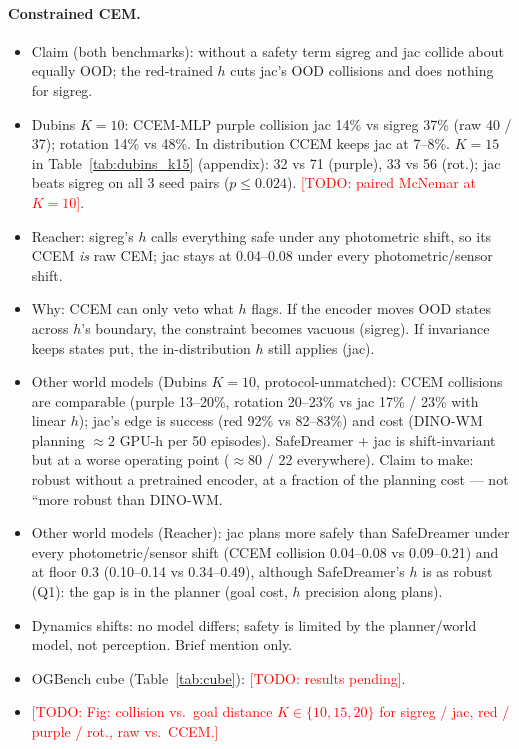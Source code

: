 \documentclass{article}
\newcommand{\todo}[1]{\textcolor{red}{[TODO: #1]}}
\begin{document}
\paragraph{Constrained CEM.}
\begin{itemize}
  \item Claim (both benchmarks): without a safety term sigreg and jac collide about equally OOD; the red-trained $h$ cuts jac's OOD collisions and does nothing for sigreg.
  \item Dubins $K=10$: CCEM-MLP purple collision jac 14\% vs sigreg 37\% (raw 40 / 37); rotation 14\% vs 48\%. In distribution CCEM keeps jac at 7--8\%. $K=15$ in Table~\ref{tab:dubins_k15} (appendix): 32 vs 71 (purple), 33 vs 56 (rot.); jac beats sigreg on all 3 seed pairs ($p\le 0.024$). \todo{paired McNemar at $K=10$}.
  \item Reacher: sigreg's $h$ calls everything safe under any photometric shift, so its CCEM \emph{is} raw CEM; jac stays at 0.04--0.08 under every photometric/sensor shift.
  \item Why: CCEM can only veto what $h$ flags. If the encoder moves OOD states across $h$'s boundary, the constraint becomes vacuous (sigreg). If invariance keeps states put, the in-distribution $h$ still applies (jac).
  \item Other world models (Dubins $K=10$, protocol-unmatched): CCEM collisions are comparable (purple 13--20\%, rotation 20--23\% vs jac 17\% / 23\% with linear $h$); jac's edge is success (red 92\% vs 82--83\%) and cost (DINO-WM planning $\approx 2$ GPU-h per 50 episodes). SafeDreamer + jac is shift-invariant but at a worse operating point ($\approx 80$ / 22 everywhere). Claim to make: robust without a pretrained encoder, at a fraction of the planning cost --- not ``more robust than DINO-WM.
  \item Other world models (Reacher): jac plans more safely than SafeDreamer under every photometric/sensor shift (CCEM collision 0.04--0.08 vs 0.09--0.21) and at floor 0.3 (0.10--0.14 vs 0.34--0.49), although SafeDreamer's $h$ is as robust (Q1): the gap is in the planner (goal cost, $h$ precision along plans).
  \item Dynamics shifts: no model differs; safety is limited by the planner/world model, not perception. Brief mention only.
  \item OGBench cube (Table~\ref{tab:cube}): \todo{results pending}.
  \item \todo{Fig: collision vs.\ goal distance $K\in\{10,15,20\}$ for sigreg / jac, red / purple / rot., raw vs.\ CCEM.}
\end{itemize}
\end{document}
